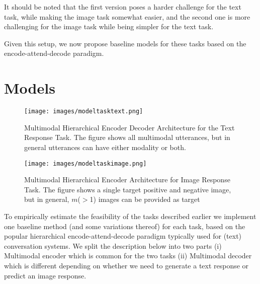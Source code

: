 \documentclass[letterpaper]{article} %
\begin{document}
It should be noted that the first version poses a harder challenge for the text task, while making the image task somewhat easier, and the second one is more challenging for the image task while being simpler for the text task.

Given this setup, we now propose baseline models for these tasks based on the encode-attend-decode paradigm.



\section{Models}
\begin{figure*}[!htb]
\centering
{
  \texttt{[image: images/modeltasktext.png]}
   \caption{\label{fig:modelTextTask} Multimodal Hierarchical Encoder Decoder Architecture for the Text Response Task. The figure shows all multimodal utterances, but in general utterances can have either modality or both. }
  } 
   
\end{figure*}
\begin{figure*}[htb]
\centering
{
  \texttt{[image: images/modeltaskimage.png]}
   \caption{ \label{fig:modelImageTask} Multimodal Hierarchical Encoder Architecture for Image Response Task. The figure shows a single target positive and negative image, but in general, $m$($>$1) images can be provided as target}
 }
  
\end{figure*}
\label{sec:models}
To empirically estimate the feasibility of the tasks described earlier we implement one baseline method (and some variations thereof) for each task, based on the popular hierarchical encode-attend-decode paradigm \cite{Serban:2016:BED:3016387.3016435} typically used for (text) conversation systems. We split the description below into two parts (i) Multimodal encoder which is common for the two tasks (ii) Multimodal decoder which is different depending on whether we need to generate a text response or predict an image response. %
\end{document}
